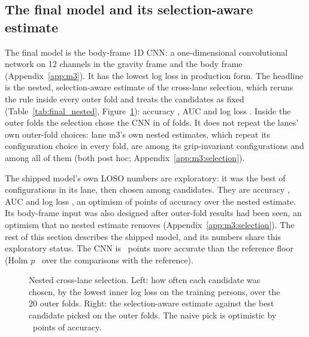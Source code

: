 \subsection{The final model and its selection-aware estimate}\label{sec:results:final}
The final model is the body-frame 1D CNN: a one-dimensional convolutional network on 12 channels in the gravity
frame and the body frame (Appendix~\ref{app:m3}). It has the lowest log loss in production form. The headline is the
nested, selection-aware estimate of the cross-lane selection, which reruns the rule inside every outer fold and
treats the  candidates as fixed (Table~\ref{tab:final_nested},
Figure~\ref{fig:FINAL_03_nested_selection}): accuracy , AUC  and
log loss . Inside the outer folds the selection chose the CNN in 
of  folds. It does not repeat the lanes' own outer-fold choices: lane m3's own nested estimates,
which repeat its configuration choice in every fold, are  among its
grip-invariant configurations and  among all of them (both post hoc;
Appendix~\ref{app:m3:selection}).

The shipped model's own LOSO numbers are exploratory: it was the best of  configurations in
its lane, then chosen among  candidates. They are accuracy , AUC
 and log loss , an optimism of 
points of accuracy over the nested estimate. Its body-frame input was also designed after outer-fold results had
been seen, an optimism that no nested estimate removes (Appendix~\ref{app:m3:selection}). The rest of this section
describes the shipped model, and its numbers share this exploratory status. The CNN is
~points more accurate than the reference floor (Holm $p$~ over the
 comparisons with the reference).


\begin{figure}[htbp]
\centering
{}
\caption{Nested cross-lane selection. Left: how often each candidate was chosen, by the lowest inner log loss on
the training persons, over the 20 outer folds. Right: the selection-aware estimate against the best candidate
picked on the outer folds. The naive pick is optimistic by ~points of accuracy.}
\label{fig:FINAL_03_nested_selection}
\end{figure}

